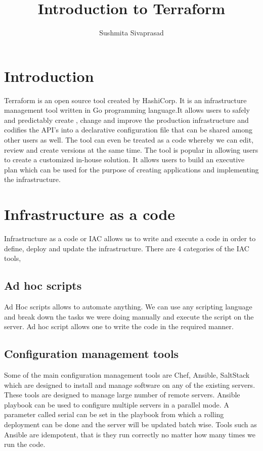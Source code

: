 \documentclass[9pt,twocolumn,twoside]{../../styles/osajnl}
\title{Introduction to Terraform}
\author[1]{Sushmita Sivaprasad}
\affil[1]{School of Informatics and Computing, Bloomington, IN 47408, U.S.A.}
\affil[*]{Corresponding authors: sushsiva@umail.iu.edu}
\begin{document}
\maketitle

\section{Introduction}

Terraform is an open source tool created by HashiCorp. It is an
infrastructure management tool written in Go programming language.It
allows users to safely and predictably create , change and improve the
production infrastructure and codifies the API's into a declarative
configuration file that can be shared among other users as
well\cite{www-terraform}. The tool can even be treated as a code
whereby we can edit, review and create versions at the same time. The
tool is popular in allowing users to create a customized in-house
solution. It allows users to build an executive plan which can be used for
the purpose of creating applications and
implementing the infrastructure\cite{www-terraform-book}.

\section{Infrastructure as a code}

Infrastructure as a code or IAC allows us to write and execute a code
in order to define, deploy and update the infrastructure. There are 4
categories of the IAC tools,

\subsection{Ad hoc scripts}

Ad Hoc scripts allows to automate anything. We can use any scripting
language and break down the tasks we were doing manually and execute
the script on the server. Ad hoc script allows one to write the code
in the required manner\cite{www-terraform-upandrunning}.

\subsection{Configuration management tools}

Some of the main configuration management tools are Chef, Ansible,
SaltStack which are designed to install and manage software on any of
the existing servers. These tools are designed to manage large number
of remote servers. Ansible playbook can be used to configure multiple
servers in a parallel mode\cite{www-terraform-upandrunning}. A
parameter called serial can be set in the playbook from which a
rolling deployment can be done and the server will be updated batch
wise. Tools such as Ansible are idempotent, that is they run correctly
no matter how many times we run the code\cite{www-terraform-upandrunning}.
\end{document}
